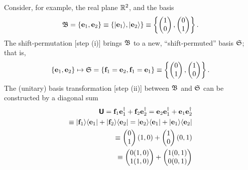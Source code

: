 {\color{blue}
\bexample
Consider, for example,
the real plane ${\Bbb R}^2$,
and the basis
$${\frak B}=\{ {\bf e}_1 , {\bf e}_2\} \equiv \{ \vert {\bf e}_1 \rangle , \vert {\bf e}_2\rangle \}
\equiv
\left\{\begin{pmatrix}1\\0\end{pmatrix},\begin{pmatrix}0\\1\end{pmatrix}\right\}.$$
The shift-permutation [step (i)] brings ${\frak B}$ to a new, ``shift-permuted'' basis  ${\frak S}$; that is,
$$\{ {\bf e}_1 , {\bf e}_2\} \mapsto {\frak S}= \{ {\bf f}_1={\bf e}_2,{\bf f}_1={\bf e}_1 \} \equiv \left\{\begin{pmatrix}0\\1\end{pmatrix},\begin{pmatrix}1\\0\end{pmatrix}\right\}.$$
The (unitary) basis transformation [step (ii)] between $ {\frak B} $ and
$  {\frak S}$ can be constructed by a diagonal sum
\begin{equation}
\begin{split}
\textsf{\textbf{U}} ={\bf f}_1  {\bf e}_1^\dagger+ {\bf f}_2  {\bf e}_2^\dagger = {\bf e}_2   {\bf e}_1^\dagger+ {\bf e}_1  {\bf e}_2^\dagger   \\
\equiv \vert {\bf f}_1\rangle \langle {\bf  e}_1\vert + \vert {\bf f}_2\rangle \langle   {\bf e}_2 \vert = \vert {\bf e}_2\rangle \langle    {\bf e}_1\vert + \vert {\bf e}_1\rangle \langle   {\bf e}_2    \vert         \\
\equiv
\begin{pmatrix}
0 \\
1
\end{pmatrix}
(1,0)+
\begin{pmatrix}
1 \\
0
\end{pmatrix}
(0,1)  \\
\qquad \equiv
\begin{pmatrix}
0 (1,0)\\
1 (1,0)
\end{pmatrix}
+
\begin{pmatrix}
1 (0,1)\\
0 (0,1)
\end{pmatrix}

\end{split}
\end{equation}}
